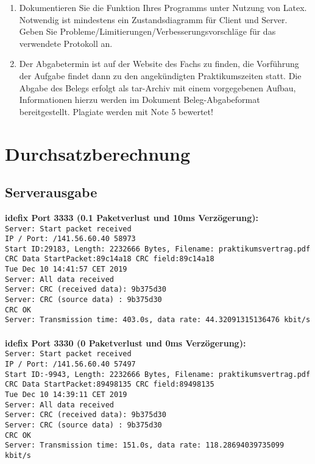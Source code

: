 \documentclass[12pt]{article}
\begin{document}
\begin{enumerate}
    \item Dokumentieren Sie die Funktion Ihres Programms unter Nutzung von Latex. Notwendig ist mindestens ein Zustandsdiagramm für Client und Server. Geben Sie Probleme/Limitierungen/Verbesserungsvorschläge für das verwendete Protokoll an.
    
    \item Der Abgabetermin ist auf der Website des Fachs zu finden, die Vorführung der Aufgabe findet dann zu den angekündigten Praktikumszeiten statt. Die Abgabe des Belegs erfolgt als tar-Archiv mit einem vorgegebenen Aufbau, Informationen hierzu werden im Dokument Beleg-Abgabeformat bereitgestellt. Plagiate werden mit Note 5 bewertet!
\end{enumerate}

\section{Durchsatzberechnung}

\subsection{Serverausgabe}
    {\bf idefix Port 3333 (0.1 Paketverlust und 10ms Verzögerung):\vspace{2mm}}
    \\
    {\tt Server: Start packet received\\
    IP / Port: /141.56.60.40 58973\\
    Start ID:29183, Length: 2232666 Bytes, Filename: praktikumsvertrag.pdf\\
    CRC Data StartPacket:89c14a18 CRC field:89c14a18\\
    Tue Dec 10 14:41:57 CET 2019\\
    Server: All data received\\
    Server: CRC (received data): 9b375d30\\
    Server: CRC (source data)  : 9b375d30\\
    CRC OK\\
    Server: Transmission time: 403.0s, data rate: 44.32091315136476 kbit/s\\}
    \\
    {\bf idefix Port 3330 (0 Paketverlust und 0ms Verzögerung):\vspace{2mm}}
    \\
    {\tt Server: Start packet received\\
    IP / Port: /141.56.60.40 57497\\
    Start ID:-9943, Length: 2232666 Bytes, Filename: praktikumsvertrag.pdf\\
    CRC Data StartPacket:89498135 CRC field:89498135\\
    Tue Dec 10 14:39:11 CET 2019\\
    Server: All data received\\
    Server: CRC (received data): 9b375d30\\
    Server: CRC (source data)  : 9b375d30\\
    CRC OK\\
    Server: Transmission time: 151.0s, data rate: 118.28694039735099 kbit/s\\}
    \\
\pagebreak
\end{document}
